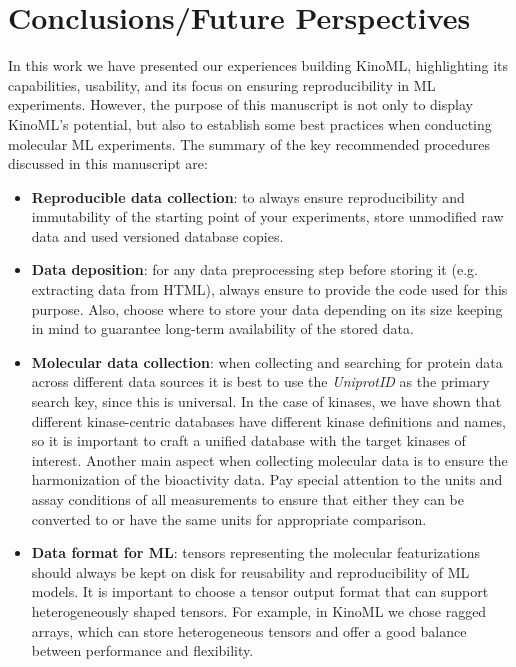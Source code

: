 \documentclass[9pt,lessons]{livecoms}
\begin{document}
\section{Conclusions/Future Perspectives}
In this work we have presented our experiences building KinoML, highlighting its capabilities, usability, and its focus on ensuring reproducibility in ML experiments. However, the purpose of this manuscript is not only to display KinoML's potential, but also to establish some best practices when conducting molecular ML experiments. The summary of the key recommended procedures discussed in this manuscript are: 
\begin{itemize}
    \item \textbf{Reproducible data collection}: to always ensure reproducibility and immutability of the starting point of your experiments, store unmodified raw data and used versioned database copies. 
    \item \textbf{Data deposition}: for any data preprocessing step before storing it (e.g. extracting data from HTML), always ensure to provide the code used for this purpose. Also, choose where to store your data depending on its size keeping in mind to guarantee long-term availability of the stored data.
    \item \textbf{Molecular data collection}: when collecting and searching for protein data across different data sources it is best to use the \textit{UniprotID} as the primary search key, since this is universal. In the case of kinases, we have shown that different kinase-centric databases have different kinase definitions and names, so it is important to craft a unified database with the target kinases of interest. 
    Another main aspect when collecting molecular data is to ensure the harmonization of the bioactivity data. Pay special attention to the units and assay conditions of all measurements to ensure that either they can be converted to or have the same units for appropriate comparison.
    \item \textbf{Data format for ML}: tensors representing the molecular featurizations should always be kept on disk for reusability and reproducibility of ML models. It is important to choose a tensor output format that can support heterogeneously shaped tensors. For example, in KinoML we chose ragged arrays, which can store heterogeneous tensors and offer a good balance between performance and flexibility.
\end{itemize}
\end{document}
